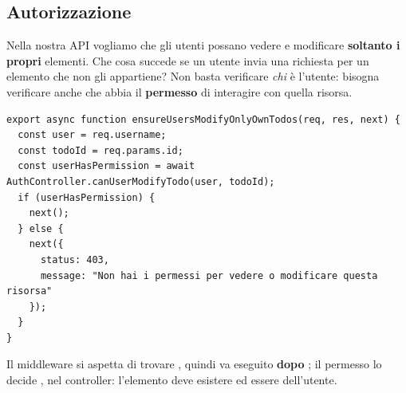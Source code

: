 \subsection{Autorizzazione}

Nella nostra API vogliamo che gli utenti possano vedere e modificare
\textbf{soltanto i propri} elementi. Che cosa succede se un utente invia una
richiesta  per un elemento che non gli appartiene? Non basta
verificare \textit{chi} è l'utente: bisogna verificare anche che abbia il
\textbf{permesso} di interagire con quella risorsa.

\begin{affianco}[0.62][c]
\codicepiccolo
\begin{lstlisting}[style=js, name=middleware/authorization.js, firstnumber=20]
export async function ensureUsersModifyOnlyOwnTodos(req, res, next) {
  const user = req.username;
  const todoId = req.params.id;
  const userHasPermission = await AuthController.canUserModifyTodo(user, todoId);
  if (userHasPermission) {
    next();
  } else {
    next({
      status: 403,
      message: "Non hai i permessi per vedere o modificare questa risorsa"
    });
  }
}
\end{lstlisting}
\risultato
\begin{immagine}
\end{immagine}
\end{affianco}

Il middleware si aspetta di trovare , quindi va eseguito
\textbf{dopo} ; il permesso lo decide
, nel controller: l'elemento deve esistere ed essere
dell'utente.


